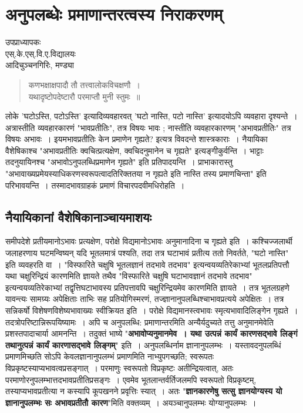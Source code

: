 {\fontsize{15}{17}\selectfont
\presetvalues
\chapter{अनुपलब्धेः प्रमाणान्तरत्वस्य निराकरणम्}

\begin{center}
\smallskip

उपप्राध्यापकः\\
एस्.के.एस्.वि.ए.विद्यालयः\\
आदिचुञ्चनगिरिः, मण्ड्या
\addrule
\end{center}

\begin{verse}
कणभक्षाक्षपादौ तौ तत्त्वालोकविचक्षणौ~। \\
यथादृष्टोपदेष्टारौ परमाप्तौ मुनी स्तुमः~॥
\end{verse}
लोके  'घटोऽस्ति, पटोऽस्ति' इत्यादिव्यवहारवत् 'घटो नास्ति, पटो नास्ति' इत्यादयोऽपि व्यवहारा दृश्यन्ते~। अत्रास्तीति व्यवहारकारणं "भावप्रतीतिः", तत्र विषयः भावः ; नास्तीति व्यवहारकारणम् "अभावप्रतीतिः" तत्र विषयः अभावः~। इयमभावप्रतीतिः केन प्रमाणेन \-गृह्यते? इत्यत्र विवदन्ते शास्त्रकाराः~। नैयायिका वैशेषिकाश्च "अभावप्रतीतिः क्वचित्प्रत्य\-क्षेण, क्वचिदनुमानेन च गृह्यते" इत्यङ्गीकुर्वन्ति~। भाट्टाः तदनुयायिनश्च "अभावोऽनुपलब्धि\-प्रमाणेन गृह्यते" इति प्रतिपादयन्ति~। प्राभाकारास्तु "अभावाख्यप्रमेयस्याधिकरणस्वरूपत्वादतिरिक्ततया न गृह्यते इति नास्ति तस्य प्रमाणचिन्ता" इति परिभावयन्ति~। तस्माद\-भावग्राहकं प्रमाणं विचारपदवीमधिरोहति~। 
 
\section*{नैयायिकानां वैशेषिकानाञ्चायमाशयः} 

समीपदेशे प्रतीयमानोऽभावः प्रत्यक्षेण, परोक्षे विद्यमानोऽभावः अनुमानादिना च गृह्यते इति~। कश्चिज्जलार्थी जलाहरणाय घटमन्विष्यन् यदि भूतलमात्रं पश्यति, तदा तत्र घटाभावं प्रतीत्य ततो निवर्तते, "घटो नास्ति" इति व्यवहरति वा~। "विस्फारिते चक्षुषि भूतलज्ञानं तदभावे तदभाव" इत्यन्वयव्यतिरेकाभ्यां भूतलप्रतिपत्तौ यथा चक्षुरिन्द्रियं कारणमिति ज्ञायते तथैव "विस्फारिते चक्षुषि घटाभावज्ञानं तदभावे तदभाव" इत्यन्वयव्यतिरेकाभ्यां तद्वृत्तिघटाभावस्य प्रतिपत्तावपि चक्षुरिन्द्रियमेव कारणमिति ज्ञायते~। तत्र भूतलग्रहणे यावन्त्यः सामग्र्यः अपेक्षिताः ताभिः सह प्रतियोगिस्मरणं, तज्ज्ञानानुपलब्धिश्चाभावप्रत्यये अपेक्षितः~। तत्र सन्नि\-कर्षो विशेषणविशेष्यभावाख्यः स्वीक्रियत इति~। परोक्षे विद्यमानस्त्वभावः स्मृत्यभावादिलिङ्गेन \-गृह्यते~। तदत्रोपरिष्टान्निरूपयिष्यामः~। अपि च अनुपलब्धि: प्रमाणान्तरमिति अन्यैर्यदुच्यते तत्तु अनुमानमेवेति प्रशस्तपादाचार्या आमनन्ति~। तदुक्तं भाष्ये "\textbf{अभावोप्यनुमानमेव~। यथा उत्पन्नं कार्यं कारणसद्भावे लिङ्गं तथानुत्पन्नं कार्यं कारणासद्भावे लिङ्गम्}" इति~। अनुपलब्धिर्नाम ज्ञानानुपलम्भः~। यस्तावदनुपलब्धिं प्रमाणमिच्छति सोऽपि केवलज्ञानानु\-\break पलम्भं प्रमाणमिति नाभ्युपगच्छति; स्वरूपतः विप्रकृष्टस्याप्यभावत्वप्रसङ्गात्~। परमाणुः स्वरूपतो विप्रकृष्टः अतीन्द्रियत्वात्, अतः परमाणोरनुपलम्भात्तदभावप्रतीतिप्रसङ्गः~। एवमेव भूत\-लान्तर्वर्तिजलमपि स्वरूपतो विप्रकृष्टम्, तस्याप्यभावप्रतीत्या न कस्यापि कूपखनने \-प्रवृत्तिः स्यात्~। अतः "\textbf{ज्ञानकारणेषु सत्सु ज्ञानयोग्यस्य यो ज्ञानानुपलम्भः सः अभाव\-प्रतीतौ कारण}"मिति वक्तव्यम्~। अयञ्चानुपलम्भः योग्यानुपलम्भः~। 


}
